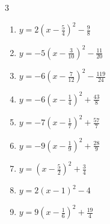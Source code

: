 \begin{multicols}{3}
\begin{enumerate}

  \item $\displaystyle y=2\left( x-\frac{5}{4}\right)^{2}-\frac{9}{8}$


  \item $\displaystyle y=-5\left( x-\frac{3}{10}\right)^{2}-\frac{11}{20}$


  \item $\displaystyle y=-6\left( x-\frac{7}{12}\right)^{2}-\frac{119}{24}$


  \item $\displaystyle y=-6\left( x-\frac{1}{4}\right)^{2}+\frac{43}{8}$


  \item $\displaystyle y=-7\left( x-\frac{1}{7}\right)^{2}+\frac{57}{7}$


  \item $\displaystyle y=-9\left( x-\frac{1}{9}\right)^{2}+\frac{28}{9}$


  \item $\displaystyle y=\left( x-\frac{5}{2}\right)^{2}+\frac{3}{4}$


  \item $\displaystyle y=2\left( x-1\right)^{2}-4$

        \phantom{$\displaystyle 頂点\left( 1 , -4 \right)$}

\columnbreak %

  \item $\displaystyle y=9\left( x-\frac{1}{6}\right)^{2}+\frac{19}{4}$



\end{enumerate}
\end{multicols}
